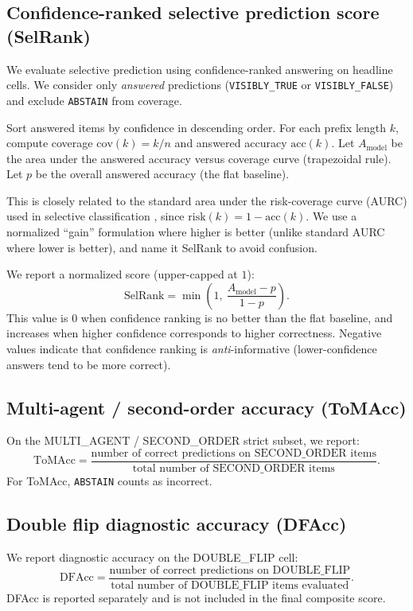 \documentclass[11pt]{article}
\begin{document}
\subsection{Confidence-ranked selective prediction score (SelRank)}
\label{subsec:selrank}

We evaluate selective prediction using confidence-ranked answering on headline cells. We consider only \emph{answered} predictions (\texttt{VISIBLY\_TRUE} or \texttt{VISIBLY\_FALSE}) and exclude \texttt{ABSTAIN} from coverage.

Sort answered items by confidence in descending order. For each prefix length \(k\), compute coverage \(\mathrm{cov}(k)=k/n\) and answered accuracy \(\mathrm{acc}(k)\). Let \(A_{\text{model}}\) be the area under the answered accuracy versus coverage curve (trapezoidal rule). Let \(p\) be the overall answered accuracy (the flat baseline).

This is closely related to the standard area under the risk-coverage curve (AURC) used in selective classification \citep{elyaniv_selective_2010,varshney_selective_2022}, since \(\mathrm{risk}(k)=1-\mathrm{acc}(k)\). We use a normalized ``gain'' formulation where higher is better (unlike standard AURC where lower is better), and name it SelRank to avoid confusion.

We report a normalized score (upper-capped at \(1\)):
\[
\mathrm{SelRank}=\min\left(1,\ \frac{A_{\text{model}}-p}{1-p}\right).
\]
This value is \(0\) when confidence ranking is no better than the flat baseline, and increases when higher confidence corresponds to higher correctness. Negative values indicate that confidence ranking is \emph{anti}-informative (lower-confidence answers tend to be more correct).

\subsection{Multi-agent / second-order accuracy (ToMAcc)}

On the MULTI\_AGENT / SECOND\_ORDER strict subset, we report:
\[
\text{ToMAcc}=\frac{\text{number of correct predictions on SECOND\_ORDER items}}{\text{total number of SECOND\_ORDER items}}.
\]
For ToMAcc, \texttt{ABSTAIN} counts as incorrect.

\subsection{Double flip diagnostic accuracy (DFAcc)}

We report diagnostic accuracy on the DOUBLE\_FLIP cell:
\[
\text{DFAcc}=\frac{\text{number of correct predictions on DOUBLE\_FLIP}}{\text{total number of DOUBLE\_FLIP items evaluated}}.
\]
DFAcc is reported separately and is not included in the final composite score.
\end{document}
